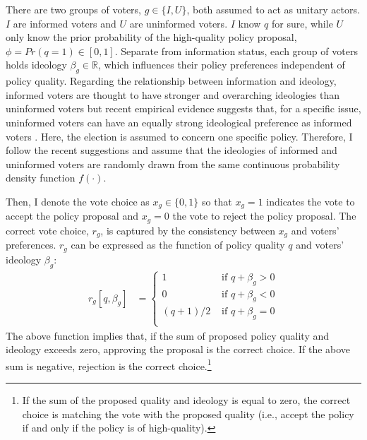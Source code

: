 \documentclass[doc,natbib,12pt]{apa6}
\begin{document}
	\par There are two groups of voters, $g \in \{I, U\}$, both assumed to act as unitary actors. $I$ are informed voters and $U$ are uninformed voters. $I$ know $q$ for sure, while $U$ only know the prior probability of the high-quality policy proposal, $\phi = Pr(q=1) \in [0, 1]$. Separate from information status, each group of voters holds ideology $\beta_g \in \mathbb{R}$, which influences their policy preferences independent of policy quality. Regarding the relationship between information and ideology, informed voters are thought to have stronger and overarching ideologies than uninformed voters \citep{Converse1964thna, Achen2016defo} but recent empirical evidence suggests that, for a specific issue, uninformed voters can have an equally strong ideological preference as informed voters \citep{Broockman2016apto}. Here, the election is assumed to concern one specific policy. Therefore, I follow the recent suggestions and assume that the ideologies of informed and uninformed voters are randomly drawn from the same continuous probability density function $f(\cdot)$.
	
	\par Then, I denote the vote choice as $x_g \in \{0,1\}$ so that $x_g=1$ indicates the vote to accept the policy proposal and $x_g=0$ the vote to reject the policy proposal. The correct vote choice, $r_g$, is captured by the consistency between $x_g$ and voters’ preferences. $r_g$ can be expressed as the function of policy quality $q$ and voters' ideology $\beta_g$:
	\begin{align}
	r_g[q, \beta_g] &= \begin{cases}
	1 &\text{ if } q + \beta_g > 0 \\
	0 &\text{ if } q + \beta_g < 0  \\
	(q + 1)/2 &\text{ if } q + \beta_g = 0\\
	\end{cases}
	\end{align}
	\noindent The above function implies that, if the sum of proposed policy quality and ideology exceeds zero, approving the proposal is the correct choice. If the above sum is negative, rejection is the correct choice.\footnote{If the sum of the proposed quality and ideology is equal to zero, the correct choice is matching the vote with the proposed quality (i.e., accept the policy if and only if the policy is of high-quality).}
	
\end{document}
